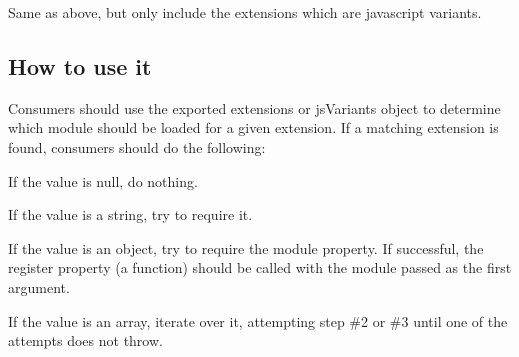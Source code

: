 Same as above, but only include the extensions which are javascript variants.

\subsection*{How to use it}

Consumers should use the exported {\ttfamily extensions} or {\ttfamily js\+Variants} object to determine which module should be loaded for a given extension. If a matching extension is found, consumers should do the following\+:


\begin{DoxyEnumerate}
\item If the value is null, do nothing.
\item If the value is a string, try to require it.
\item If the value is an object, try to require the {\ttfamily module} property. If successful, the {\ttfamily register} property (a function) should be called with the module passed as the first argument.
\item If the value is an array, iterate over it, attempting step \#2 or \#3 until one of the attempts does not throw. 
\end{DoxyEnumerate}